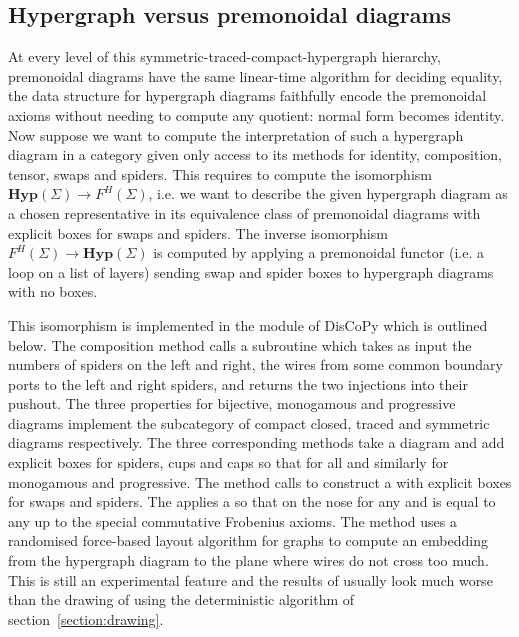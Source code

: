 \subsection{Hypergraph versus premonoidal diagrams}\label{subsection:hypergraph-vs-premonoidal}

At every level of this symmetric-traced-compact-hypergraph hierarchy, premonoidal diagrams have the same linear-time algorithm for deciding equality, the data structure for hypergraph diagrams faithfully encode the premonoidal axioms without needing to compute any quotient: normal form becomes identity.
Now suppose we want to compute the interpretation of such a hypergraph diagram in a category given only access to its methods for identity, composition, tensor, swaps and spiders.
This requires to compute the isomorphism $\mathbf{Hyp}(\Sigma) \to F^H(\Sigma)$, i.e. we want to describe the given hypergraph diagram as a chosen representative in its equivalence class of premonoidal diagrams with explicit boxes for swaps and spiders.
The inverse isomorphism $F^H(\Sigma) \to \mathbf{Hyp}(\Sigma)$ is computed by applying a premonoidal functor (i.e. a  loop on a list of layers) sending swap and spider boxes to hypergraph diagrams with no boxes.

This isomorphism is implemented in the  module of DisCoPy which is outlined below.
The composition method calls a  subroutine which takes as input the numbers of spiders on the left and right, the wires from some common boundary ports to the left and right spiders, and returns the two injections into their pushout.
The three properties for bijective, monogamous and progressive diagrams implement the subcategory of compact closed, traced and symmetric diagrams respectively.
The three corresponding methods take a diagram and add explicit boxes for spiders, cups and caps so that  for all  and similarly for monogamous and progressive.
The  method calls  to construct a  with explicit boxes for swaps and spiders.
The  applies a  so that  on the nose for any  and  is equal to any  up to the special commutative Frobenius axioms.
The  method uses a randomised force-based layout algorithm for graphs to compute an embedding from the hypergraph diagram to the plane where wires do not cross too much.
This is still an experimental feature and the results of  usually look much worse than the drawing of  using the deterministic algorithm of section~\ref{section:drawing}.

